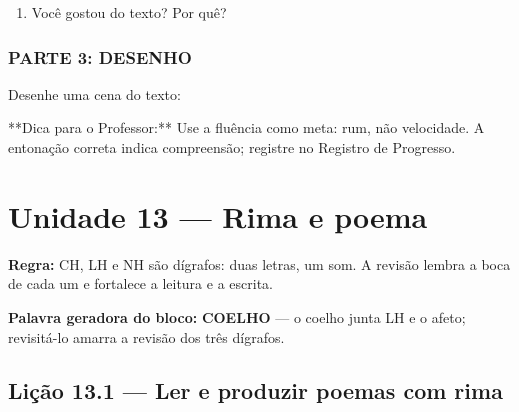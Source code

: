 \begin{exercicio}
\begin{enumerate}
  \item Você gostou do texto? Por quê?
  \begin{center}
  \underline{\hspace{12cm}}
  \end{center}

\end{enumerate}

\subsection*{PARTE 3: DESENHO}

Desenhe uma cena do texto:

\begin{center}
\end{center}

\end{exercicio}

\begin{dica}
**Dica para o Professor:** Use a fluência como meta: rum, não velocidade. A entonação correta indica compreensão; registre no Registro de Progresso.
\end{dica}


\chapter{Unidade 13 --- Rima e poema}


\textbf{Regra:} CH, LH e NH são dígrafos: duas letras, um som. A revisão lembra a boca de cada um e fortalece a leitura e a escrita.

\textbf{Palavra geradora do bloco:} \textbf{COELHO} --- o coelho junta LH e o afeto; revisitá-lo amarra a revisão dos três dígrafos.

\section{Lição 13.1 --- Ler e produzir poemas com rima}

